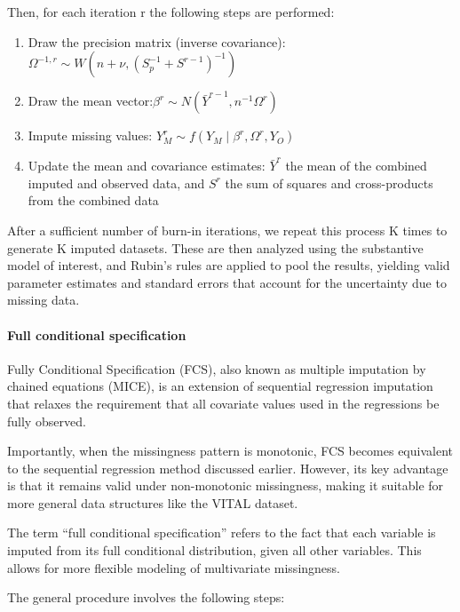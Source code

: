 \documentclass{article}
\begin{document}
Then, for each iteration r the following steps are performed:

\begin{enumerate}
\def\labelenumi{\arabic{enumi}.}
\item
  Draw the precision matrix (inverse
  covariance):\(\Omega^{-1,r} \sim W(n + \nu, (S_p^{-1} + S^{r-1})^{-1})\)
\item
  Draw the mean
  vector:\(\beta^{r} \sim N(\bar{Y}^{r-1}, n^{-1} \Omega^r)\)
\item
  Impute missing values:
  \(Y_{M}^{r} \sim f(Y_{M} \mid \beta^{r}, \Omega^{r}, Y_{O})\)
\item
  Update the mean and covariance estimates: \(\bar{Y}^{r}\) the mean of
  the combined imputed and observed data, and \(S^{r}\) the sum of
  squares and cross-products from the combined data
\end{enumerate}

After a sufficient number of burn-in iterations, we repeat this process
K times to generate K imputed datasets. These are then analyzed using
the substantive model of interest, and Rubin's rules are applied to pool
the results, yielding valid parameter estimates and standard errors that
account for the uncertainty due to missing data.

\paragraph{Full conditional
specification}\label{full-conditional-specification}

Fully Conditional Specification (FCS), also known as multiple imputation
by chained equations (MICE), is an extension of sequential regression
imputation that relaxes the requirement that all covariate values used
in the regressions be fully observed.

Importantly, when the missingness pattern is monotonic, FCS becomes
equivalent to the sequential regression method discussed earlier.
However, its key advantage is that it remains valid under non-monotonic
missingness, making it suitable for more general data structures like
the VITAL dataset.

The term ``full conditional specification'' refers to the fact that each
variable is imputed from its full conditional distribution, given all
other variables. This allows for more flexible modeling of multivariate
missingness.

The general procedure involves the following steps:
\end{document}
